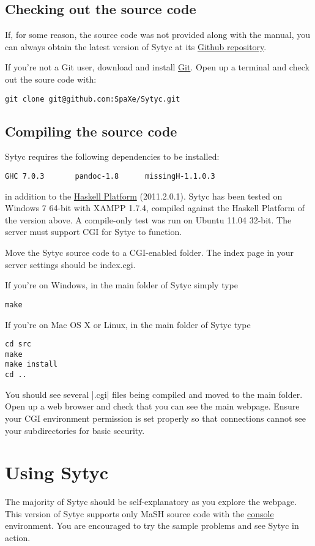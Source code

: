 \documentclass[a4paper]{article}
\begin{document}
\subsection{Checking out the source code}

If, for some reason, the source code was not provided along with the manual, you can always obtain the latest version of Sytyc at its  \href{https://github.com/SpaXe/Sytyc}{Github repository}.

If you're not a Git user, download and install \href{http://git-scm.com/}{Git}.  Open up a terminal and check out the soure code with:
\begin{verbatim}
git clone git@github.com:SpaXe/Sytyc.git
\end{verbatim}

\subsection{Compiling the source code}

Sytyc requires the following dependencies to be installed:
\begin{verbatim}
GHC 7.0.3       pandoc-1.8      missingH-1.1.0.3
\end{verbatim}
in addition to the \href{http://hackage.haskell.org/platform/}{Haskell Platform} (2011.2.0.1).  Sytyc has been tested on Windows 7 64-bit with XAMPP 1.7.4, compiled against the Haskell Platform of the version above.  A compile-only test was run on Ubuntu 11.04 32-bit.  The server must support CGI for Sytyc to function.  

Move the Sytyc source code to a CGI-enabled folder.  The index page in your server settings should be index.cgi.

If you're on Windows, in the main folder of Sytyc simply type
\begin{verbatim}
make
\end{verbatim}

If you're on Mac OS X or Linux, in the main folder of Sytyc type
\begin{verbatim}
cd src
make
make install
cd ..
\end{verbatim}

You should see several |.cgi| files being compiled and moved to the main folder.  Open up a web browser and check that you can see the main webpage.  Ensure your CGI environment permission is set properly so that connections cannot see your subdirectories for basic security.

\section{Using Sytyc}
The majority of Sytyc should be self-explanatory as you explore the webpage.  This version of Sytyc supports only MaSH source code with the \href{http://www.ict.griffith.edu.au/arock/MaSH/console.html}{console} environment.  You are encouraged to try the sample problems and see Sytyc in action.
\end{document}
